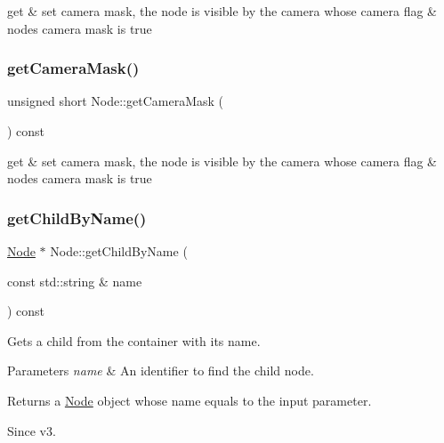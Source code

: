 get \& set camera mask, the node is visible by the camera whose camera flag \& node\textquotesingle{}s camera mask is true \mbox{\label{classNode_a1c849d2d0bd878a4e3dd1a52ab90fee8}} 
\subsubsection{\texorpdfstring{get\+Camera\+Mask()}{getCameraMask()}\hspace{0.1cm}{\footnotesize\ttfamily [2/2]}}
{\footnotesize\ttfamily unsigned short Node\+::get\+Camera\+Mask (\begin{DoxyParamCaption}{ }\end{DoxyParamCaption}) const\hspace{0.3cm}{\ttfamily [inline]}}

get \& set camera mask, the node is visible by the camera whose camera flag \& node\textquotesingle{}s camera mask is true \mbox{\label{classNode_ac2f84f995c7d6581787abaa3b09c4518}} 
\subsubsection{\texorpdfstring{get\+Child\+By\+Name()}{getChildByName()}\hspace{0.1cm}{\footnotesize\ttfamily [1/4]}}
{\footnotesize\ttfamily \hyperlink{classNode}{Node} $\ast$ Node\+::get\+Child\+By\+Name (\begin{DoxyParamCaption}\item[{const std\+::string \&}]{name }\end{DoxyParamCaption}) const\hspace{0.3cm}{\ttfamily [virtual]}}

Gets a child from the container with its name.


\begin{DoxyParams}{Parameters}
{\em name} & An identifier to find the child node.\\
\hline
\end{DoxyParams}
\begin{DoxyReturn}{Returns}
a \hyperlink{classNode}{Node} object whose name equals to the input parameter.
\end{DoxyReturn}
\begin{DoxySince}{Since}
v3. 
\end{DoxySince}


